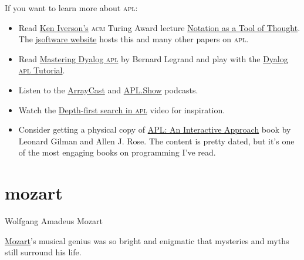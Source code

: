 \documentclass{article}
\begin{document}
If you want to learn more about \textsc{apl}:
\begin{itemize}
  \item
    Read \href{https://en.wikipedia.org/wiki/Kenneth_E._Iverson}{Ken Iverson's} \textsc{acm} Turing Award lecture \href{https://dl.acm.org/doi/10.1145/358896.358899}{Notation as a Tool of Thought}.
    The \href{https://www.jsoftware.com/papers/}{jsoftware website} hosts this and many other papers on \textsc{apl}.
  \item
    Read \href{http://www.dyalog.com/mastering-dyalog-apl.htm}{Mastering Dyalog \textsc{apl}} by Bernard Legrand and play with the \href{https://tutorial.dyalog.com/}{Dyalog \textsc{apl} Tutorial}.
  \item
    Listen to the \href{https://arraycast.com/}{ArrayCast} and \href{https://apl.show/}{APL.Show} podcasts.
  \item
    Watch the \href{https://youtu.be/DsZdfnlh_d0}{Depth-first search in \textsc{apl}} video for inspiration.
  \item
    Consider getting a physical copy of \href{https://www.amazon.com/APL-Interactive-Approach-Leonard-Gilman/dp/0471093041}{APL: An Interactive Approach} book by Leonard Gilman and Allen J. Rose.
    The content is pretty dated, but it's one of the most engaging books on programming I've read.
\end{itemize}

\section{mozart}{Wolfgang Amadeus Mozart}

\href{https://en.wikipedia.org/wiki/Wolfgang_Amadeus_Mozart}{Mozart}'s musical genius was so bright and enigmatic that mysteries and myths still surround his life.
\end{document}
